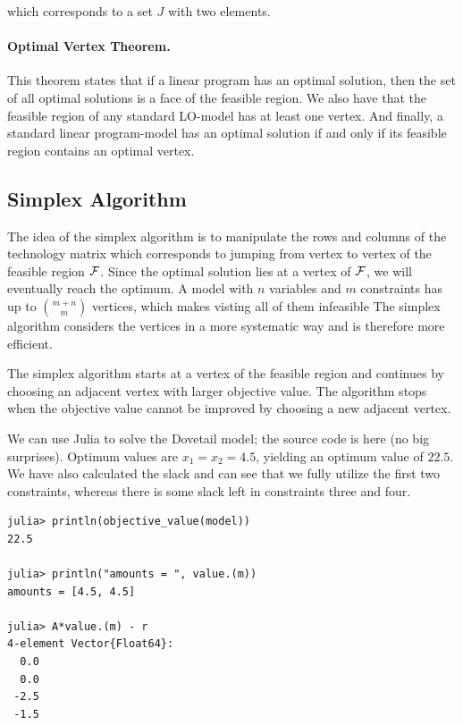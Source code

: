 which corresponds to a set $J$ with two elements.


\paragraph{Optimal Vertex Theorem.} This theorem states that if a linear program has an optimal solution, then the set of all optimal solutions is a face of the feasible region. We also have that the feasible region of any standard LO-model has at least one vertex. And finally, a standard linear program-model has an optimal solution if and only if its feasible region contains an optimal vertex.






\subsection{Simplex Algorithm}

The idea of the simplex algorithm is to manipulate the rows and columns of the technology matrix which corresponds to jumping from vertex to vertex of the feasible region $\mathcal{F}$. Since the optimal solution lies at a vertex of $\mathcal{F}$, we will eventually reach the optimum. A model with $n$ variables and $m$ constraints has up to ${m+n \choose m}$ vertices, which makes visting all of them infeasible The simplex algorithm considers the vertices in a more systematic way and is therefore more efficient. 

The simplex algorithm starts at a vertex of the feasible region and continues by choosing an adjacent vertex with larger objective value. The algorithm stops when the objective value cannot be improved by choosing a new adjacent vertex.


We can use Julia to solve the Dovetail model; the source code is here (no big surprises). Optimum values are $x_1 = x_2 = 4.5$, yielding an optimum value of $22.5$. We have also calculated the slack and can see that we fully utilize the first two constraints, whereas there is some slack left in constraints three and four.

\begin{verbatim}
julia> println(objective_value(model))
22.5

julia> println("amounts = ", value.(m))
amounts = [4.5, 4.5]

julia> A*value.(m) - r
4-element Vector{Float64}:
  0.0
  0.0
 -2.5
 -1.5
\end{verbatim}

